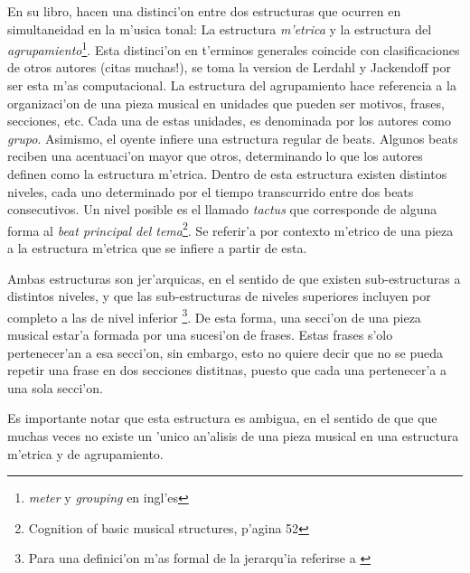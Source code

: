 En su libro, \citet*{LerdahlJackendoff83} hacen una distinci'on entre dos estructuras que ocurren en simultaneidad en la m'usica tonal:
La estructura \emph{m'etrica} y la estructura del \emph{agrupamiento}\footnote{\emph{meter} y \emph{grouping} en ingl'es}. 
Esta distinci'on en t'erminos generales coincide con clasificaciones de otros autores (\alert{citas muchas!}), se toma la version de Lerdahl y Jackendoff 
por ser esta m'as computacional.
La estructura del agrupamiento hace referencia a la organizaci'on de una pieza musical en unidades que pueden ser motivos, frases, secciones, etc. 
Cada una de estas unidades, es denominada por los autores como \emph{grupo}. Asimismo, el oyente infiere una estructura regular de beats. 
Algunos beats reciben una acentuaci'on mayor que otros, determinando lo que los autores definen como la estructura m'etrica. Dentro de esta estructura
existen distintos niveles, cada uno determinado por el tiempo transcurrido entre dos beats consecutivos. 
Un nivel posible es el llamado \emph{tactus} que corresponde de alguna forma al \emph{beat principal del tema}\footnote{Cognition of basic musical structures, p'agina 52}.
Se referir'a por contexto m'etrico de una pieza a la estructura m'etrica que se infiere a partir de esta.

Ambas estructuras son jer'arquicas, en el sentido de que existen sub-estructuras a distintos niveles, y que las sub-estructuras de niveles superiores 
incluyen por completo a las de nivel inferior
\footnote{Para una definici'on m'as formal de la jerarqu'ia referirse a \cite[p. XXX]{LerdahlJackendoff83}}. De esta forma, una secci'on
de una pieza musical estar'a formada por una sucesi'on de frases. Estas frases s'olo pertenecer'an a esa secci'on, sin embargo, esto no quiere decir
que no se pueda repetir una frase en dos secciones distitnas, puesto que cada una pertenecer'a a una sola secci'on. 

%
%
%
Es importante notar que esta estructura es ambigua, en el sentido de que que muchas veces no existe un 'unico an'alisis de una pieza musical 
en una estructura m'etrica y de agrupamiento.


